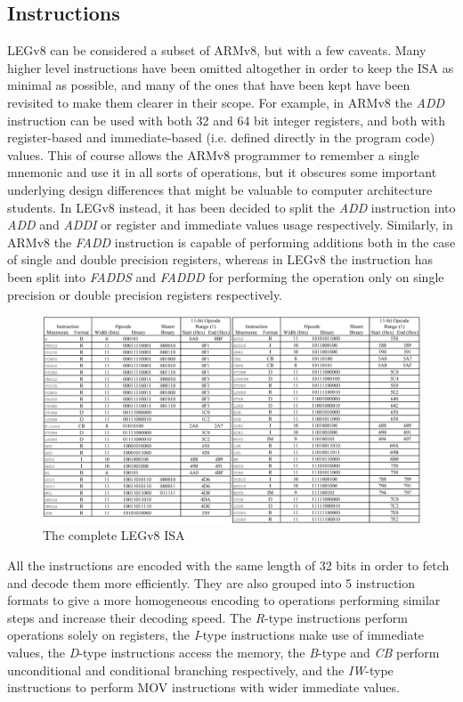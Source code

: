 \subsection*{Instructions}
LEGv8 can be considered a subset of ARMv8, but with a few caveats. Many higher level instructions have been omitted altogether in order to keep the ISA as minimal as possible, and many of the ones that have been kept have been revisited to make them clearer in their scope. For example, in ARMv8 the \emph{ADD} instruction can be used with both 32 and 64 bit integer registers, and both with register-based and immediate-based (i.e. defined directly in the program code) values. This of course allows the ARMv8 programmer to remember a single mnemonic and use it in all sorts of operations, but it obscures some important underlying design differences that might be valuable to computer architecture students. In LEGv8 instead, it has been decided to split the \emph{ADD} instruction into \emph{ADD} and \emph{ADDI} or register and immediate values usage respectively. Similarly, in ARMv8 the \emph{FADD} instruction is capable of performing additions both in the case of single and double precision registers, whereas in LEGv8 the instruction has been split into \emph{FADDS} and \emph{FADDD} for performing the operation only on single precision or double precision registers respectively.
\begin{figure}[H]
	\centering
	\includegraphics[width=.8\textwidth]{img/legv8_instruction_set.png}
	\caption{The complete LEGv8 ISA}
\end{figure}
All the instructions are encoded with the same length of 32 bits in order to fetch and decode them more efficiently. They are also grouped into 5 instruction formats to give a more homogeneous encoding to operations performing similar steps and increase their decoding speed.
The \emph{R}-type instructions perform operations solely on registers, the \emph{I}-type instructions make use of immediate values, the \emph{D}-type instructions access the memory, the \emph{B}-type and \emph{CB} perform unconditional and conditional branching respectively, and the \emph{IW}-type instructions to perform MOV instructions with wider immediate values.
